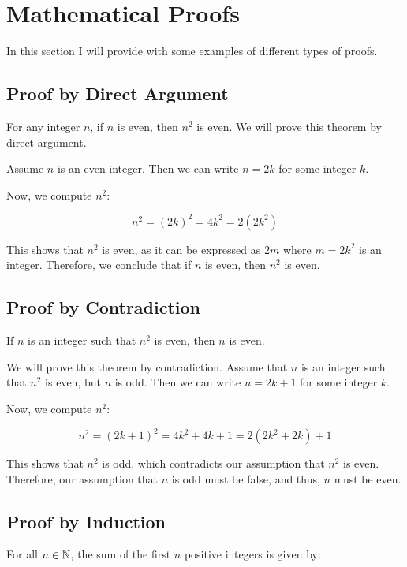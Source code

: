\newpage
\section{Mathematical Proofs}

In this section I will provide with some examples of different types of proofs.

\subsection{Proof by Direct Argument}

For any integer \(n\), if \(n\) is even, then \( n^2 \) is even.
We will prove this theorem by direct argument.

Assume \(n\) is an even integer. Then we can write \( n = 2k \) for some integer \(k\).

Now, we compute \( n^2 \):

\[		
	n^2 = {(2k)}^2 = 4k^2 = 2(2k^2)
\]
	
This shows that \( n^2 \) is even, as it can be expressed as \( 2m \) where \( m = 2k^2 \) is an integer.
Therefore, we conclude that if \(n\) is even, then \( n^2 \) is even.

\QED

\subsection{Proof by Contradiction}

If \(n\) is an integer such that \( n^2 \) is even, then \(n\) is even.

We will prove this theorem by contradiction. Assume that \(n\) is an integer such that \( n^2 \) is 
even, but \(n\) is odd. Then we can write \( n = 2k + 1 \) for some integer \(k\).

Now, we compute \( n^2 \):

\[
	n^2 = {(2k + 1)}^2 = 4k^2 + 4k + 1 = 2(2k^2 + 2k) + 1
\]
	
This shows that \( n^2 \) is odd, which contradicts our assumption that \( n^2 \) is even. Therefore, our 
assumption that \(n\) is odd must be false, and thus, \(n\) must be even.

\QED

\subsection{Proof by Induction}

For all \( n \in \mathbb{N} \), the sum of the first \(n\) positive integers is given by:

